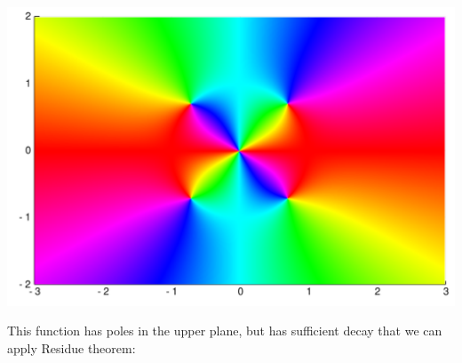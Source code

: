\documentclass[12pt,a4paper]{article}
\begin{document}
\includegraphics[width=\linewidth]{figures/Lecture5_2_1.pdf}

This function has poles in the upper plane, but has sufficient decay that we can apply Residue theorem:
\end{document}
